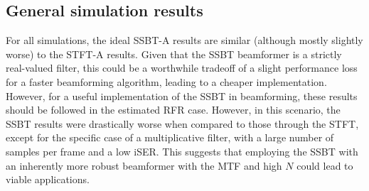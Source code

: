 
\subsection{General simulation results}

For all simulations, the ideal SSBT-A results are similar (although mostly slightly worse) to the STFT-A results. Given that the SSBT beamformer is a strictly real-valued filter, this could be a worthwhile tradeoff of a slight performance loss for a faster beamforming algorithm, leading to a cheaper implementation.
However, for a useful implementation of the SSBT in beamforming, these results should be followed in the estimated RFR case. However, in this scenario, the SSBT results were drastically worse when compared to those through the STFT, except for the specific case of a multiplicative filter, with a large number of samples per frame and a low iSER. This suggests that employing the SSBT with an inherently more robust beamformer with the MTF and high $N$ could lead to viable applications.